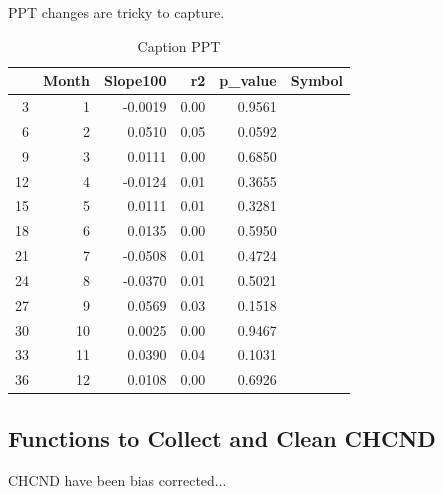 \documentclass{article}\usepackage[]{graphicx}\usepackage[]{color}
\begin{document}
PPT changes are tricky to capture.

\begin{table}[ht]
\centering
\begin{tabular}{rrrrrl}
  \hline
 & Month & Slope100 & r2 & p\_value & Symbol \\ 
  \hline
3 & 1 & -0.0019 & 0.00 & 0.9561 &  \\ 
  6 & 2 & 0.0510 & 0.05 & 0.0592 &  \\ 
  9 & 3 & 0.0111 & 0.00 & 0.6850 &  \\ 
  12 & 4 & -0.0124 & 0.01 & 0.3655 &  \\ 
  15 & 5 & 0.0111 & 0.01 & 0.3281 &  \\ 
  18 & 6 & 0.0135 & 0.00 & 0.5950 &  \\ 
  21 & 7 & -0.0508 & 0.01 & 0.4724 &  \\ 
  24 & 8 & -0.0370 & 0.01 & 0.5021 &  \\ 
  27 & 9 & 0.0569 & 0.03 & 0.1518 &  \\ 
  30 & 10 & 0.0025 & 0.00 & 0.9467 &  \\ 
  33 & 11 & 0.0390 & 0.04 & 0.1031 &  \\ 
  36 & 12 & 0.0108 & 0.00 & 0.6926 &  \\ 
   \hline
\end{tabular}
\caption{Caption PPT} 
\end{table}





\subsection{Functions to Collect and Clean CHCND}

CHCND have been bias corrected...
\end{document}
